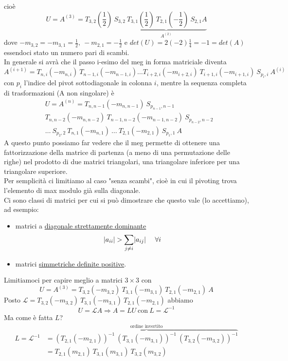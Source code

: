 \documentclass[12pt,a4paper]{article}
\DeclarePairedDelimiter{\abs}{\lvert}{\rvert}
\begin{document}
cioè
\[
U = A^{(3)} = T_{3,2} (\frac{1}{2}) \ S_{3,2} \underbrace{\ T_{3,1} (\frac{1}{2}) \ T_{2,1} (-\frac{1}{2}) \ S_{2,1} A}_{A^{(2)}}
\]
dove $-m_{3,2} = -m_{3,1} = \frac{1}{2}, \ -m_{2,1} = -\frac{1}{2}$ e $det(U) = 2(-2)\frac{1}{4} = -1 = det(A)$ essendoci stato un numero pari di scambi.\\
In generale si avrà che il passo i-esimo del meg in forma matriciale diventa
\[
    A^{(i+1)} = T_{n,i} (-m_{n, i}) \ T_{n-1, i} (-m_{n-1, i}) \dotso T_{i+2, i} (-m_{i+2, i})\ T_{i+1, i} (-m_{i+1, i}) \ S_{p_i, i} \ A^{(i)}
\]
con $p_i$ l'indice del pivot sottodiagonale in colonna $i$, mentre la sequenza completa di trasformazioni (A non singolare) è
\[
\begin{split}
    & U = A^{(n)} = T_{n, n-1} (-m_{n, n-1}) \ S_{p_{n-1}, n-1} \\
    & T_{n, n-2} (-m_{n, n-2}) \ T_{n-1, n-2} (-m_{n-1, n-2}) \ S_{p_{n-2}, n-2} \\
    & \dotso \ S_{p_2, 2} \ T_{n,1} (-m_{n,1}) \ \dotso \ T_{2,1} (-m_{2,1}) \ S_{p_1, 1} \ A
\end{split}
\]
A questo punto possiamo far vedere che il meg permette di ottenere una fattorizzazione della matrice di partenza (a meno di una permutazione delle righe) nel prodotto di due matrici triangolari, una triangolare inferiore per una triangolare superiore.\\
Per semplicità ci limitiamo al caso "senza scambi", cioè in cui il pivoting trova l'elemento di max modulo già sulla diagonale.\\
Ci sono classi di matrici per cui si può dimostrare che questo vale (lo accettiamo), ad esempio:
\begin{itemize}
    \item matrici a \underline{diagonale strettamente dominante}
    \[
        \abs{a_{ii}} > \sum_{j \neq i} \abs{a_{ij}} \  \  \  \ \forall i
    \]
    
    \item matrici \underline{simmetriche definite positive}. \end{itemize} Limitiamoci per capire meglio a matrici $3 \times 3$ con
    \[
    U = A^{(3)} = T_{3,2} (-m_{3,2}) \ T_{3,1} (-m_{3,1}) \ T_{2,1} (-m_{2,1}) \ A
    \]
    Posto $\mathcal{L} = T_{3,2} (-m_{3,2}) \ T_{3,1} (-m_{3,1}) \ T_{2,1} (-m_{2,1})$ abbiamo
    \[
    U = \mathcal{L}A \Rightarrow A = LU \ \text{con} \ L = \mathcal{L}^{-1}
    \]
    Ma come è fatta $L$?
    \[
    \begin{split}
        L = \mathcal{L}^{-1} & = \overbrace{(T_{2,1} (-m_{2,1}))^{-1} \ (T_{3,1} (-m_{3,1}))^{-1} \ (T_{3,2} (-m_{3,2}))^{-1}}^{\text{ordine invertito}} \\
        & = T_{2,1} (m_{2,1}) \ T_{3,1} (m_{3,1}) \ T_{3,2} (m_{3,2})
    \end{split}
    \]
\end{document}
